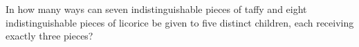 In how many ways can seven indistinguishable pieces of taffy and eight indistinguishable pieces of licorice be given to five distinct children, each receiving exactly three pieces?
